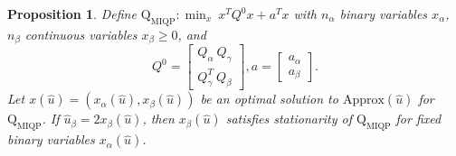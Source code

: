 \documentclass[10pt,a4paper]{amsart}
\newtheorem{proposition}{Proposition}
\begin{document}
\begin{proposition}\label{prop:fixed-point}
    Define $\mathrm{Q}_{\mathrm{MIQP}}:\min_x\ x^TQ^0x + a^Tx$ with $n_\alpha$ binary variables $x_\alpha$, $n_\beta$ continuous variables $x_\beta \geq 0$, and
    \[Q^0=\begin{bmatrix}
            Q_\alpha\ Q_\gamma \\
            Q_\gamma^T\ Q_\beta
        \end{bmatrix}, a = \begin{bmatrix}
            a_\alpha\\
            a_\beta
        \end{bmatrix}.\]
    Let $x(\hat{u})=(x_\alpha(\hat{u}), x_\beta(\hat{u}))$ be an optimal solution to $\mathrm{Approx}(\hat{u})$ for $\mathrm{Q}_{\mathrm{MIQP}}$. If $\hat{u}_\beta=2x_\beta(\hat{u})$, then $x_\beta(\hat{u})$ satisfies stationarity of $\mathrm{Q}_{\mathrm{MIQP}}$ for fixed binary variables $x_\alpha(\hat{u})$.
\end{proposition}
\end{document}
